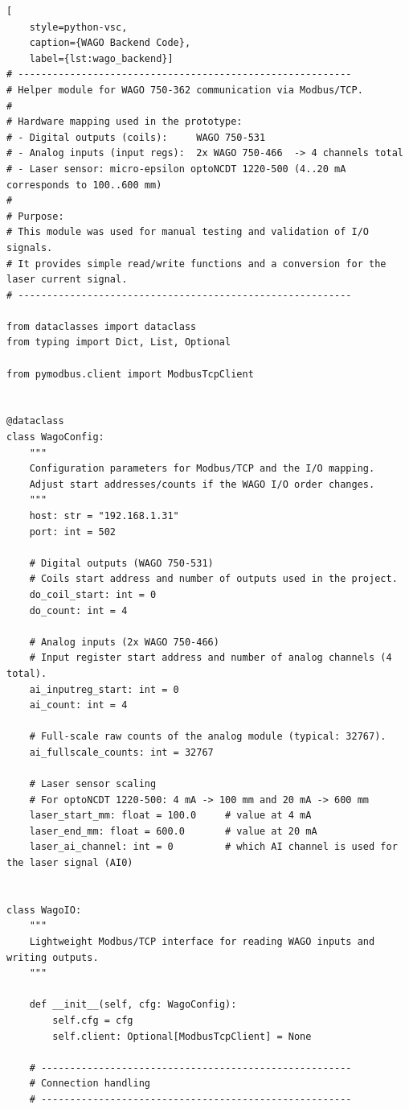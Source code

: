\begin{lstlisting}[
    style=python-vsc,
    caption={WAGO Backend Code},
    label={lst:wago_backend}]
# ----------------------------------------------------------
# Helper module for WAGO 750-362 communication via Modbus/TCP.
#
# Hardware mapping used in the prototype:
# - Digital outputs (coils):     WAGO 750-531
# - Analog inputs (input regs):  2x WAGO 750-466  -> 4 channels total
# - Laser sensor: micro-epsilon optoNCDT 1220-500 (4..20 mA corresponds to 100..600 mm)
#
# Purpose:
# This module was used for manual testing and validation of I/O signals.
# It provides simple read/write functions and a conversion for the laser current signal.
# ----------------------------------------------------------

from dataclasses import dataclass
from typing import Dict, List, Optional

from pymodbus.client import ModbusTcpClient


@dataclass
class WagoConfig:
    """
    Configuration parameters for Modbus/TCP and the I/O mapping.
    Adjust start addresses/counts if the WAGO I/O order changes.
    """
    host: str = "192.168.1.31"
    port: int = 502

    # Digital outputs (WAGO 750-531)
    # Coils start address and number of outputs used in the project.
    do_coil_start: int = 0
    do_count: int = 4

    # Analog inputs (2x WAGO 750-466)
    # Input register start address and number of analog channels (4 total).
    ai_inputreg_start: int = 0
    ai_count: int = 4

    # Full-scale raw counts of the analog module (typical: 32767).
    ai_fullscale_counts: int = 32767

    # Laser sensor scaling
    # For optoNCDT 1220-500: 4 mA -> 100 mm and 20 mA -> 600 mm
    laser_start_mm: float = 100.0     # value at 4 mA
    laser_end_mm: float = 600.0       # value at 20 mA
    laser_ai_channel: int = 0         # which AI channel is used for the laser signal (AI0)


class WagoIO:
    """
    Lightweight Modbus/TCP interface for reading WAGO inputs and writing outputs.
    """

    def __init__(self, cfg: WagoConfig):
        self.cfg = cfg
        self.client: Optional[ModbusTcpClient] = None

    # ------------------------------------------------------
    # Connection handling
    # ------------------------------------------------------


\end{lstlisting}
